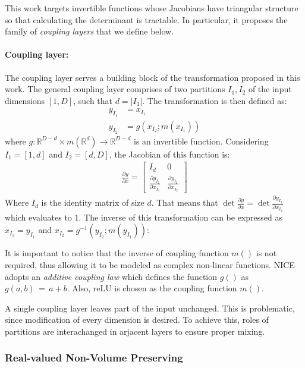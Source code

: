 \documentclass[runningheads]{llncs}
\begin{document}
This work targets invertible functions whose Jacobians have triangular structure so that calculating the determinant is tractable. In particular, it proposes the family of \textit{coupling layers} that we define below.

\paragraph{Coupling layer:} The coupling layer serves a building block of the transformation proposed in this work. The general coupling layer comprises of two partitions $I_{1}, I_{2}$ of the input dimensions  $\left[ 1, D \right]$, such that $d = \lvert I_{1} \rvert$. The transformation is then defined as:
\begin{align}
y_{I_{1}} &= x_{I_{1}} \\
y_{I_{2}} &= g(x_{I_{2}} ; m(x_{I_{1}}))
\end{align}
where
$g: \mathbb{R}^{D-d} \times m(\mathbb{R}^{d}) \rightarrow \mathbb{R}^{D-d}$ is an invertible function. Considering 
$I_{1} = \left[ 1, d \right]$ and $I_{2} = \left[ d, D \right]$,
the Jacobian of this function is:
\begin{align*}
\frac{\partial y}{\partial x} =
\begin{bmatrix}
I_{d} & 0 \\
\frac{\partial y_{I_{2}}}{\partial x_{I_{1}}} & \frac{\partial y_{I_{2}}}{\partial x_{I_{2}}} 
\end{bmatrix}
\end{align*}
Where $I_{d}$ is the identity matrix of size $d$. That means that
$\det \frac{\partial y}{\partial x} = \det \frac{\partial y_{I_{2}}}{\partial x_{I_{2}}}$ which evaluates to $1$. 
The inverse of this transformation can be expressed as $x_{I_{1}} = y_{I_{1}}$ and $x_{I_{2}} = g^{-1}(y_{I_{2}} ; m(y_{I_{1}}))$:

It is important to notice that the inverse of coupling function $m()$ is not required, thus allowing it to be modeled as complex non-linear functions. NICE adopts an \textit{additive coupling law} which defines the function $g()$ as $g(a,b)\,=\,a+b$. Also, reLU is chosen as the coupling function $m()$.

A single coupling layer leaves part of the input unchanged. This is problematic, since modification of every dimension is desired. To achieve this, roles of partitions are interachanged in arjacent layers to ensure proper mixing. 
 
\subsubsection{Real-valued Non-Volume Preserving} \label{sec:realnvp}
\end{document}
